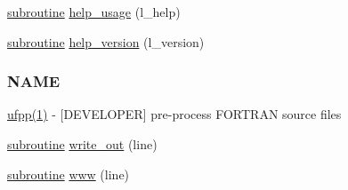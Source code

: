 \begin{DoxyCompactItemize}
\item 
\hyperlink{M__stopwatch_83_8txt_acfbcff50169d691ff02d4a123ed70482}{subroutine} \hyperlink{namespacem__fpp_a17c5179799e6700fe39fb3bd2ec85d01}{help\+\_\+usage} (l\+\_\+help)
\item 
\hyperlink{M__stopwatch_83_8txt_acfbcff50169d691ff02d4a123ed70482}{subroutine} \hyperlink{namespacem__fpp_a7a571f61ee26c2a637c1530d2271ab23}{help\+\_\+version} (l\+\_\+version)
\begin{DoxyCompactList}\small\item\em \subsubsection*{N\+A\+ME}

\hyperlink{ufpp__overview_81_8txt_a97c20a96bcab81bc74c9d64b001f1202}{ufpp(1)} -\/ \mbox{[}D\+E\+V\+E\+L\+O\+P\+ER\mbox{]} pre-\/process F\+O\+R\+T\+R\+AN source files \end{DoxyCompactList}\item 
\hyperlink{M__stopwatch_83_8txt_acfbcff50169d691ff02d4a123ed70482}{subroutine} \hyperlink{namespacem__fpp_a945cf0930719327ca5ee9a866c11dc7a}{write\+\_\+out} (line)
\item 
\hyperlink{M__stopwatch_83_8txt_acfbcff50169d691ff02d4a123ed70482}{subroutine} \hyperlink{namespacem__fpp_ac474947a9f75959822fccd4d82a05258}{www} (line)
\end{DoxyCompactItemize}
